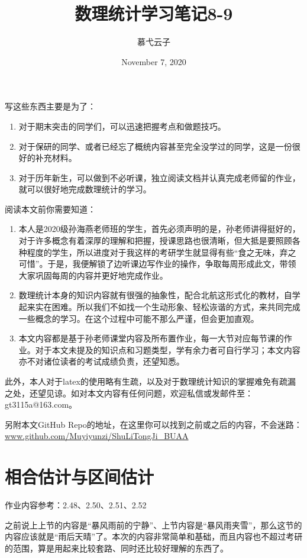\documentclass[10pt, a4paper]{article}
\title{数理统计学习笔记8-9}
\author{慕弋云子}
\date{November 7, 2020}
\begin{document}
\setcounter{section}{7}
\maketitle

写这些东西主要是为了：
\begin{enumerate}
    \item 对于期末突击的同学们，可以迅速把握考点和做题技巧。
    \item 对于保研的同学、或者已经忘了概统内容甚至完全没学过的同学，这是一份很好的补充材料。
    \item 对于历年新生，可以做到不必听课，独立阅读文档并认真完成老师留的作业，就可以很好地完成数理统计的学习。
\end{enumerate}

阅读本文前你需要知道：
\begin{enumerate}
    \item 本人是2020级孙海燕老师班的学生，首先必须声明的是，孙老师讲得挺好的，对于许多概念有着深厚的理解和把握，授课思路也很清晰，但大抵是要照顾各种程度的学生，所以进度对于我这样的考研学生就显得有些“食之无味，弃之可惜”。于是，我便解锁了边听课边写作业的操作，争取每周形成此文，带领大家巩固每周的内容并更好地完成作业。
    \item 数理统计本身的知识内容就有很强的抽象性，配合北航这形式化的教材，自学起来实在困难。所以我们不如找一个生动形象、轻松诙谐的方式，来共同完成一些概念的学习。在这个过程中可能不那么严谨，但会更加直观。
    \item 本文内容都是基于孙老师课堂内容及所布置作业，每一大节对应每节课的作业。对于本文未提及的知识点和习题类型，学有余力者可自行学习；本文内容亦不对诸位读者的考试成绩负责，还望知悉。
\end{enumerate}\par

此外，本人对于latex的使用略有生疏，以及对于数理统计知识的掌握难免有疏漏之处，还望见谅。如对本文内容有任何问题，欢迎私信或发邮件至：gt3115a@163.com。\par
另附本文GitHub Repo的地址，在这里你可以找到之前或之后的内容，不会迷路：\url{www.github.com/Muyiyunzi/ShuLiTongJi_BUAA}

\section{相合估计与区间估计}
作业内容参考：2.48、2.50、2.51、2.52\par

之前说上上节的内容是“暴风雨前的宁静”、上节内容是“暴风雨夹雪”，那么这节的内容应该就是“雨后天晴”了。本次的内容非常简单和基础，而且内容也不超过考研的范围，算是用起来比较套路、同时还比较好理解的东西了。\par
\end{document}
